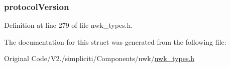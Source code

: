 \hypertarget{structsmplVersionInfo__t_a69ba4ce44c8b3df5af22db880cdb9c20}{
\subsubsection[{protocol\-Version}]{ {\bf protocol\-Version}}}\label{structsmplVersionInfo__t_a69ba4ce44c8b3df5af22db880cdb9c20}


\-Definition at line 279 of file nwk\-\_\-types.\-h.



\-The documentation for this struct was generated from the following file\-:\begin{DoxyCompactItemize}
\item 
\-Original Code/\-V2./simpliciti/\-Components/nwk/\hyperlink{nwk__types_8h}{nwk\-\_\-types.\-h}\end{DoxyCompactItemize}
